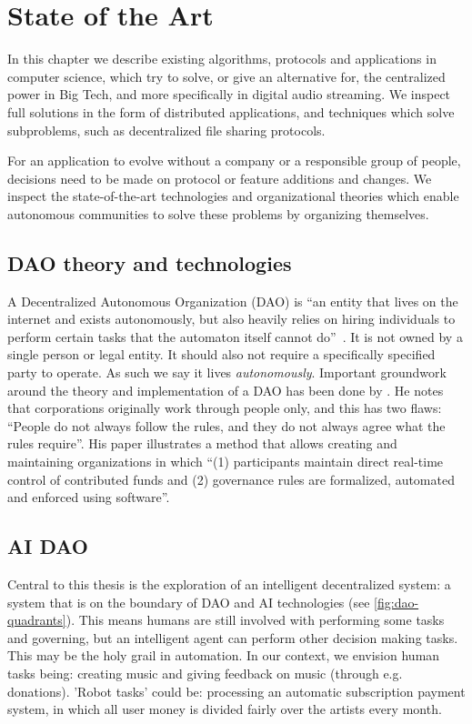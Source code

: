 \chapter{\label{chap:state-of-the-art}State of the Art}
In this chapter we describe existing algorithms, protocols and applications in computer science, which try to solve, or give an alternative for, the centralized power in Big Tech, and more specifically in digital audio streaming. We inspect full solutions in the form of distributed applications, and techniques which solve subproblems, such as decentralized file sharing protocols.

For an application to evolve without a company or a responsible group of people, decisions need to be made on protocol or feature additions and changes. We inspect the state-of-the-art technologies and organizational theories which enable autonomous communities to solve these problems by organizing themselves.

\section{DAO theory and technologies}
A Decentralized Autonomous Organization (DAO) is ``an entity that lives on the internet and exists autonomously, but also heavily relies on hiring individuals to perform certain tasks that the automaton itself cannot do''~\citep{buterin2014dao}. It is not owned by a single person or legal entity. It should also not require a specifically specified party to operate. As such we say it lives \textit{autonomously}. Important groundwork around the theory and implementation of a DAO has been done by \cite{jentzsch2016decentralized}. He notes that corporations originally work through people only, and this has two flaws: ``People do not always follow the rules, and they do not always agree what the rules require''. His paper illustrates a method that allows creating and maintaining organizations in which ``(1) participants maintain direct real-time control of contributed funds and (2) governance rules are formalized, automated and enforced using software''.

\section{AI DAO}
Central to this thesis is the exploration of an intelligent decentralized system: a system that is on the boundary of DAO and AI technologies (see \ref{fig:dao-quadrants}). This means humans are still involved with performing some tasks and governing, but an intelligent agent can perform other decision making tasks. This may be the holy grail in automation. In our context, we envision human tasks being: creating music and giving feedback on music (through e.g. donations). 'Robot tasks' could be: processing an automatic subscription payment system, in which all user money is divided fairly over the artists every month.

